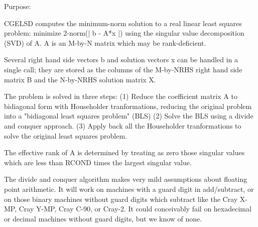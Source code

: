  \begin{DoxyParagraph}{Purpose\+: }
\begin{DoxyVerb} CGELSD computes the minimum-norm solution to a real linear least
 squares problem:
     minimize 2-norm(| b - A*x |)
 using the singular value decomposition (SVD) of A. A is an M-by-N
 matrix which may be rank-deficient.

 Several right hand side vectors b and solution vectors x can be
 handled in a single call; they are stored as the columns of the
 M-by-NRHS right hand side matrix B and the N-by-NRHS solution
 matrix X.

 The problem is solved in three steps:
 (1) Reduce the coefficient matrix A to bidiagonal form with
     Householder tranformations, reducing the original problem
     into a "bidiagonal least squares problem" (BLS)
 (2) Solve the BLS using a divide and conquer approach.
 (3) Apply back all the Householder tranformations to solve
     the original least squares problem.

 The effective rank of A is determined by treating as zero those
 singular values which are less than RCOND times the largest singular
 value.

 The divide and conquer algorithm makes very mild assumptions about
 floating point arithmetic. It will work on machines with a guard
 digit in add/subtract, or on those binary machines without guard
 digits which subtract like the Cray X-MP, Cray Y-MP, Cray C-90, or
 Cray-2. It could conceivably fail on hexadecimal or decimal machines
 without guard digits, but we know of none.\end{DoxyVerb}
 
\end{DoxyParagraph}

